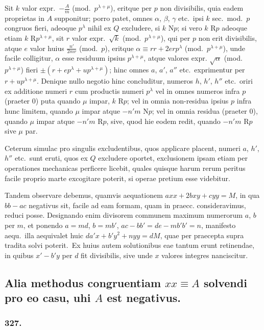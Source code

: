 \documentclass[12pt,a4paper]{article}
\theoremstyle{plain}
\theoremstyle{definition}
\theoremstyle{remark}
\begin{document}
Sit $k$ valor expr.\ $-\frac{A}{m}$ (mod.\ $p^{\lambda+\mu}$), eritque per $p$ non divisibilis,
quia eadem proprietas in $A$ supponitur; porro patet, omnes $\alpha$, $\beta$, $\gamma$
etc.\ ipsi $k$ sec.\ mod.\ $p$ congruos fieri, adeoque $p^\lambda$ nihil ex $Q$ excludere,
si $k$ N$p$; si vero $k$ R$p$ adeoque etiam $k$ R$p^{\lambda+\mu}$, sit $r$ valor expr.\ $\sqrt{k}$
(mod.\ $p^{\lambda+\mu}$), qui per $p$ non erit divisibilis, atque $e$ valor huius
$\frac{n'}{2mr}$ (mod.\ $p$), eritque $\alpha\equiv rr+2erp^\lambda$ (mod.\ $p^{\lambda+\mu}$), unde facile
colligitur, $\alpha$ esse residuum ipsius $p^{\lambda+\mu}$, atque valores expr.
$\sqrt{\alpha}$ (mod.\ $p^{\lambda+\mu}$) fieri $\pm(r+ep^\lambda+up^{\lambda+\mu})$; hinc omnes $a$, $a'$, $a''$
etc.\ exprimentur per $r+up^{\lambda+\mu}$. Denique nullo negotio hinc concluditur,
numeros $h$, $h'$, $h''$ etc.\ oriri ex additione numeri $r$ cum productis
numeri $p^\lambda$ vel in omnes numeros infra $p$ (praeter 0) puta quando $\mu$ impar,
$k$ R$p$; vel in omnia non-residua ipsius $p$ infra hunc limitem, quando
$\mu$ impar atque $-n'm$ N$p$; vel in omnia residua (praeter 0), quando
$\mu$ impar atque $-n'm$ R$p$, sive, quod hie eodem redit, quando $-n'm$ R$p$
sive $\mu$ par.

Ceterum simulac pro singulis excludentibus, quos applicare placent,
numeri $a$, $h'$, $h''$ etc.\ sunt eruti, quos ex $Q$ excludere oportet, exclusionem
ipsam etiam per operationes mechanicas perficere licebit, quales quisque
harum rerum peritus facile proprio marte excogitare poterit, si operae
pretium esse videbitur.

Tandem observare debemus, quamvis aequationem $axx+2bxy+cyy=M$,
in qua $bb-ac$ negativus sit, facile ad eam formam, quam in praecc.
consideravimus, reduci posse. Designando enim divisorem communem
maximum numerorum $a$, $b$ per $m$, et ponendo $a=md$, $b=mb'$,
$ac-bb'=de-mb'b'=n$, manifesto aequ.\ illa aequivalet huic
$da'x+b'y^2+nyy=dM$, quae per praecepta supra tradita solvi poterit.\ Ex
huius autem solutionibus eae tantum erunt retinendae, in quibus $x'-b'y$ per
$d$ fit divisibilis, sive unde $x$ valores integres nanciscitur.

\subsection*{Alia methodus congruentiam $xx\equiv A$ solvendi pro eo casu,
uhi $A$ est negativus.}

\subsubsection*{327.}
\end{document}
